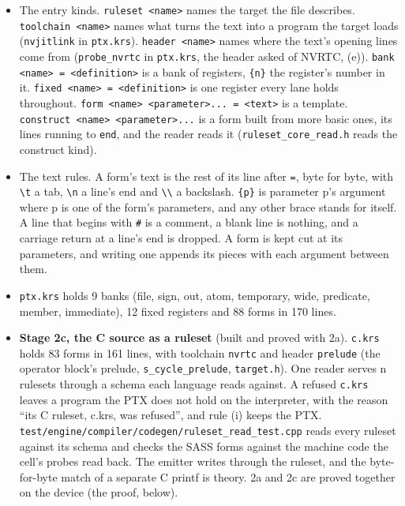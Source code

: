 \begin{enumerate}
\begin{itemize}
\begin{enumerate}
\begin{itemize}
\begin{itemize}
\item The entry kinds. \texttt{ruleset <name>} names the target the file describes. \texttt{toolchain <name>} names what turns the text into a program the target loads (\texttt{nvjitlink} in \texttt{ptx.\allowbreak{}krs}). \texttt{header <name>} names where the text's opening lines come from (\texttt{probe\_\allowbreak{}nvrtc} in \texttt{ptx.\allowbreak{}krs}, the header asked of NVRTC, (e)). \texttt{bank <name> = <definition>} is a bank of registers, \texttt{\{n\}} the register's number in it. \texttt{fixed <name> = <definition>} is one register every lane holds throughout. \texttt{form <name> <parameter>.\allowbreak{}.\allowbreak{}.\allowbreak{} = <text>} is a template. \texttt{construct <name> <parameter>.\allowbreak{}.\allowbreak{}.\allowbreak{}} is a form built from more basic ones, its lines running to \texttt{end}, and the reader reads it (\texttt{ruleset\_\allowbreak{}core\_\allowbreak{}read.\allowbreak{}h} reads the construct kind).
\item The text rules. A form's text is the rest of its line after \texttt{=}, byte for byte, with \texttt{\textbackslash{}t} a tab, \texttt{\textbackslash{}n} a line's end and \texttt{\textbackslash{}\textbackslash{}} a backslash. \texttt{\{p\}} is parameter p's argument where p is one of the form's parameters, and any other brace stands for itself. A line that begins with \texttt{\#} is a comment, a blank line is nothing, and a carriage return at a line's end is dropped. A form is kept cut at its parameters, and writing one appends its pieces with each argument between them.
\item \texttt{ptx.\allowbreak{}krs} holds 9 banks (file, sign, out, atom, temporary, wide, predicate, member, immediate), 12 fixed registers and 88 forms in 170 lines.
\item \textbf{Stage 2c, the C source as a ruleset} (built and proved with 2a). \texttt{c.\allowbreak{}krs} holds 83 forms in 161 lines, with toolchain \texttt{nvrtc} and header \texttt{prelude} (the operator block's prelude, \texttt{s\_\allowbreak{}cycle\_\allowbreak{}prelude}, \texttt{target.\allowbreak{}h}). One reader serves n rulesets through a schema each language reads against. A refused \texttt{c.\allowbreak{}krs} leaves a program the PTX does not hold on the interpreter, with the reason “its C ruleset, c.krs, was refused”, and rule (i) keeps the PTX. \texttt{test/\allowbreak{}engine/\allowbreak{}compiler/\allowbreak{}codegen/\allowbreak{}ruleset\_\allowbreak{}read\_\allowbreak{}test.\allowbreak{}cpp} reads every ruleset against its schema and checks the SASS forms against the machine code the cell's probes read back. The emitter writes through the ruleset, and the byte-for-byte match of a separate C printf is theory. 2a and 2c are proved together on the device (the proof, below).

\end{itemize}
\end{itemize}
\end{enumerate}
\end{itemize}
\end{enumerate}
